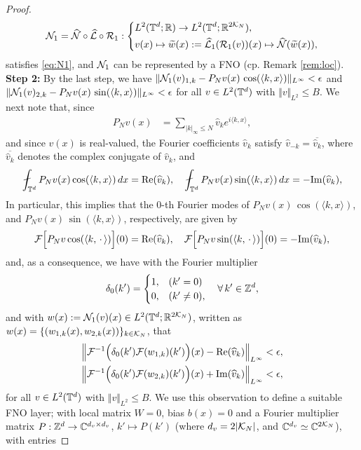 \documentclass[reqno,a4paper]{amsart}
\begin{document}
\begin{proof}
\begin{align*}
\mathcal{N}_1 = \widehat{\mathcal{N}} \circ \widehat{\mathcal{L}}\circ \mathcal{R}_1: 
\left\{
\begin{aligned}
&L^2(\mathbb{T}^d;\mathbb{R}) \to L^2(\mathbb{T}^d;\mathbb{R}^{2\mathcal{K}_N}), 
\\
&v(x) \mapsto \widetilde{w}(x) := \widehat{\mathcal{L}}_1(\mathcal{R}_1(v))(x) \mapsto \widehat{\mathcal{N}}(\widetilde{w}(x)),
\end{aligned}
\right.
\end{align*}
satisfies \eqref{eq:N1}, and $\mathcal{N}_1$ can be represented by a FNO (cp. Remark \ref{rem:loc}).
\textbf{Step 2:} By the last step, we have $\Vert \mathcal{N}_1(v)_{1,k} - P_Nv(x) \, \cos(\langle k, x\rangle)\Vert_{L^\infty} < \epsilon$ and $\Vert \mathcal{N}_1(v)_{2,k} - P_Nv(x) \, \sin(\langle k, x\rangle)\Vert_{L^\infty} < \epsilon$ for all $v\in L^2(\mathbb{T}^d)$ with $\Vert v \Vert_{L^2}\le B$.  We next note that, since 
\begin{align*}
P_Nv(x) 
&= \sum_{|k|_\infty\le N} \hat{v}_k e^{i\langle k, x\rangle},
\end{align*}
and since $v(x)$ is real-valued, the Fourier coefficients $\hat{v}_k$ satisfy $\hat{v}_{-k} = \overline{\hat{v}_k}$, where $\overline{\hat{v}_k}$ denotes the complex conjugate of ${\hat{v}_k}$, and 
\[
\fint_{\T^d} P_Nv(x) \cos(\langle k, x\rangle) \, dx
=
\Re(\hat{v}_k),
\quad
\fint_{\T^d} P_Nv(x) \sin(\langle k, x\rangle) \, dx
=
-\Im(\hat{v}_k),
\]
In particular, this implies that the $0$-th Fourier modes of $P_Nv(x) \, \cos(\langle k, x\rangle)$, and $P_Nv(x) \, \sin(\langle k, x \rangle)$, respectively, are given by
\begin{align*}
\mathcal{F}\Big[P_Nv \cos(\langle k, {\,\cdot\,}\rangle)\Big](0)
=
\mathrm{Re}(\widehat{v}_k),
\quad
\mathcal{F}\Big[P_Nv \sin(\langle k, {\,\cdot\,}\rangle)\Big](0)
=
-\mathrm{Im}(\widehat{v}_k),
\end{align*}
and, as a consequence, we have with the Fourier multiplier 
\[
\delta_{0}(k') = 
\begin{cases}
1, & (k'=0) \\
0, & (k'\ne 0),
\end{cases}
\quad 
\forall \, k'\in \mathbb{Z}^d,
\]
 and with $w(x) := \mathcal{N}_1(v)(x) \in L^2(\mathbb{T}^d;\mathbb{R}^{2\mathcal{K}_N})$, written as $w(x) = \{(w_{1,k}(x), w_{2,k}(x))\}_{k\in \mathcal{K}_N}$,  that 
 \begin{align*}
\left\Vert 
\mathcal{F}^{-1}\Big(\delta_0(k')\mathcal{F}(w_{1,k})(k')\Big)(x) - \mathrm{Re}(\widehat{v}_k) 
\right\Vert_{L^\infty} < \epsilon, \\
\left\Vert 
\mathcal{F}^{-1}\Big(\delta_0(k')\mathcal{F}(w_{2,k})(k')\Big)(x) + \mathrm{Im}(\widehat{v}_k) 
\right\Vert_{L^\infty} < \epsilon,
\end{align*}
for all $v\in L^2(\mathbb{T}^d)$ with $\Vert v \Vert_{L^2}\le B$. We use this observation to define a suitable FNO layer; with local matrix $W = 0$, bias $b(x) = 0$ and a Fourier multiplier matrix $P: \mathbb{Z}^d \to \mathbb{C}^{d_v\times d_v}$, $k' \mapsto P(k')$ (where $d_v = 2|\mathcal{K}_N|$, and $\mathbb{C}^{d_v} \simeq \mathbb{C}^{2\mathcal{K}_N}$), with entries 

\end{proof}
\end{document}

